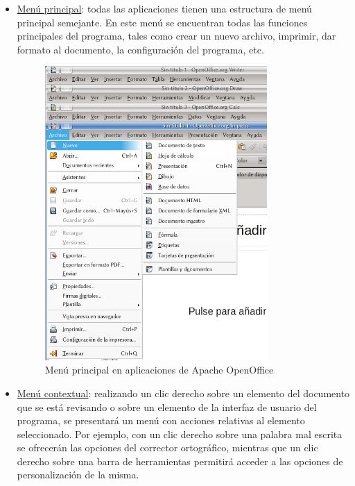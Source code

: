 \documentclass[12pt]{article}
\begin{document}
\begin{itemize}
\item \underline{Menú principal}: todas las aplicaciones tienen una estructura de menú principal semejante. En este menú se encuentran todas las funciones principales del programa, tales como crear un nuevo archivo, imprimir, dar formato al documento, la configuración del programa, etc.

\begin{figure}[H]
\centering
\includegraphics[width=0.8\textwidth]{menuAppsOO.png}
\renewcommand{\figurename}{Fig.}
\caption{Menú principal en aplicaciones de Apache OpenOffice}
\label{contexto:figura}
\end{figure}

\item \underline{Menú contextual}: realizando un clic derecho sobre un elemento del documento que se está revisando o sobre un elemento de la interfaz de usuario del programa, se presentará un menú con acciones relativas al elemento seleccionado. Por ejemplo, con un clic derecho sobre una palabra mal escrita se ofrecerán las opciones del corrector ortográfico, mientras que un clic derecho sobre una barra de herramientas permitirá acceder a las opciones de personalización de la misma.


\end{itemize}
\end{document}
